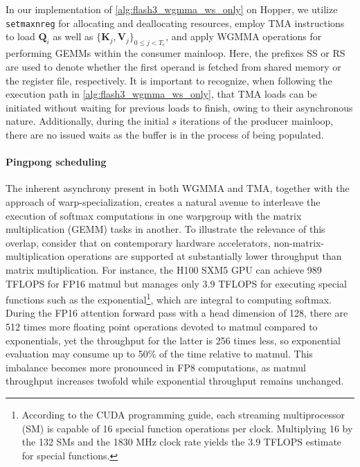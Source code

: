 In our implementation of \cref{alg:flash3_wgmma_ws_only} on Hopper, we utilize \verb|setmaxnreg| for allocating and deallocating resources, employ TMA instructions to load $\mathbf{Q}_i$ as well as $\{ \mathbf{K}_j, \mathbf{V}_j \}_{0 \leq j < T_c}$, and apply WGMMA operations for performing GEMMs within the consumer mainloop. Here, the prefixes SS or RS are used to denote whether the first operand is fetched from shared memory or the register file, respectively. It is important to recognize, when following the execution path in \cref{alg:flash3_wgmma_ws_only}, that TMA loads can be initiated without waiting for previous loads to finish, owing to their asynchronous nature. Additionally, during the initial $s$ iterations of the producer mainloop, there are no issued waits as the buffer is in the process of being populated.

\paragraph{Pingpong scheduling} The inherent asynchrony present in both WGMMA and TMA, together with the approach of warp-specialization, creates a natural avenue to interleave the execution of softmax computations in one warpgroup with the matrix multiplication (GEMM) tasks in another. To illustrate the relevance of this overlap, consider that on contemporary hardware accelerators, non-matrix-multiplication operations are supported at substantially lower throughput than matrix multiplication. For instance, the H100 SXM5 GPU can achieve 989 TFLOPS for FP16 matmul but manages only 3.9 TFLOPS for executing special functions such as the exponential\footnote{According to the CUDA programming guide, each streaming multiprocessor (SM) is capable of 16 special function operations per clock. Multiplying 16 by the 132 SMs and the 1830 MHz clock rate yields the 3.9 TFLOPS estimate for special functions.}, which are integral to computing softmax. During the FP16 attention forward pass with a head dimension of 128, there are 512 times more floating point operations devoted to matmul compared to exponentials, yet the throughput for the latter is 256 times less, so exponential evaluation may consume up to 50\% of the time relative to matmul. This imbalance becomes more pronounced in FP8 computations, as matmul throughput increases twofold while exponential throughput remains unchanged.

